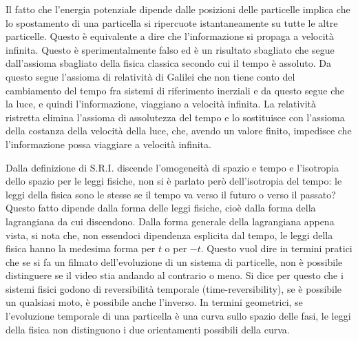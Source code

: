 \documentclass[
10pt, %
a4paper, %
oneside, %
headinclude,footinclude, %
BCOR5mm, %
]{scrartcl}
\begin{document}
\begin{osservazione}
	Il fatto che l'energia potenziale dipende dalle posizioni delle particelle implica che lo spostamento di una particella si ripercuote istantaneamente su tutte le altre particelle. Questo è equivalente a dire che l'informazione si propaga a velocità infinita. Questo è sperimentalmente falso ed è un risultato sbagliato che segue dall'assioma sbagliato della fisica classica secondo cui il tempo è assoluto. Da questo segue l'assioma di relatività di Galilei che non tiene conto del cambiamento del tempo fra sistemi di riferimento inerziali e da questo segue che la luce, e quindi l'informazione, viaggiano a velocità infinita. La relatività ristretta elimina l'assioma di assolutezza del tempo e lo sostituisce con l'assioma della costanza della velocità della luce, che, avendo un valore finito, impedisce che l'informazione possa viaggiare a velocità infinita. 
\end{osservazione}
\begin{osservazione}
	Dalla definizione di S.R.I. discende l'omogeneità di spazio e tempo e l'isotropia dello spazio per le leggi fisiche, non si è parlato però dell'isotropia del tempo: le leggi della fisica sono le stesse se il tempo va verso il futuro o verso il passato? Questo fatto dipende dalla forma delle leggi fisiche, cioè dalla forma della lagrangiana da cui discendono. Dalla forma generale della lagrangiana appena vista, si nota che, non essendoci dipendenza esplicita dal tempo, le leggi della fisica hanno la medesima forma per \(t\) o per \(-t\). Questo vuol dire in termini pratici che se si fa un filmato dell'evoluzione di un sistema di particelle, non è possibile distinguere se il video stia andando al contrario o meno. Si dice per questo che i sistemi fisici godono di reversibilità temporale (time-reversibility), se è possibile un qualsiasi moto, è possibile anche l'inverso. In termini geometrici, se l'evoluzione temporale di una particella è una curva sullo spazio delle fasi, le leggi della fisica non distinguono i due orientamenti possibili della curva. 
\end{osservazione}
\end{document}

